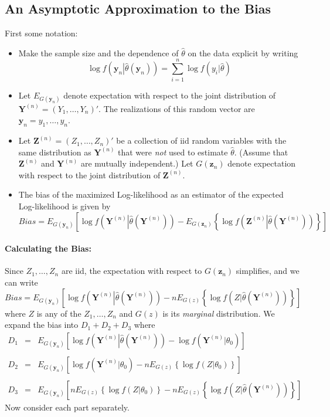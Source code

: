 \documentclass[12pt]{article}
\theoremstyle{definition}
\begin{document}
\subsection{An Asymptotic Approximation to the Bias}
First some notation:
	\begin{itemize}
		\item Make the sample size and the dependence of $\hat{\theta}$ on the data explicit by writing
	$$\log{f\left(\left.\mathbf{y}_n\right|\hat{\theta}(\mathbf{y}_n)\right)} = \sum_{i=1}^n \log{f(y_i|\hat{\theta})}$$
		\item Let $E_{G(\mathbf{y}_n)}$ denote expectation with respect to the joint distribution of $\mathbf{Y}^{(n)} = (Y_1, \hdots, Y_n)'$. The realizations of this random vector are $\mathbf{y}_n = y_1, \hdots, y_n$.
		\item Let $\mathbf{Z}^{(n)} = (Z_1, \hdots, Z_n)'$ be a collection of iid random variables with the same distribution as $\mathbf{Y}^{(n)}$ that were \emph{not} used to estimate $\hat{\theta}$. (Assume that $\mathbf{Z}^{(n)}$ and $\mathbf{Y}^{(n)}$ are mutually independent.) Let $G(\mathbf{z}_n)$ denote expectation with respect to the joint distribution of $\mathbf{Z}^{(n)}$.
		\item The bias of the maximized Log-likelihood as an estimator of the expected Log-likelihood is given by
	$$Bias = E_{G(\mathbf{y}_n)}\left[ \log{f\left(\left.\mathbf{Y}^{(n)}\right|\hat{\theta}\left(\mathbf{Y}^{(n)}\right)\right)} -  E_{G(\mathbf{z}_n)}\left\{  \log{f\left(\left.\mathbf{Z}^{(n)}\right|\hat{\theta}\left(\mathbf{Y}^{(n)}\right)\right)}\right\}\right]$$
\end{itemize}


\paragraph{Calculating the Bias:} Since $Z_1, \hdots, Z_n$ are iid, the expectation with respect to $G(\mathbf{z}_n)$ simplifies, and we can write
			$$Bias = E_{G(\mathbf{y}_n)}\left[ \log{f\left(\left.\mathbf{Y}^{(n)}\right|\hat{\theta}\left(\mathbf{Y}^{(n)}\right)\right)} -  nE_{G(z)}\left\{  \log{f\left(\left.Z\right|\hat{\theta}\left(\mathbf{Y}^{(n)}\right)\right)}\right\}\right]$$
where $Z$ is any of the $Z_1, \hdots, Z_n$ and $G(z)$ is its \emph{marginal} distribution. We expand the bias into $D_1 + D_2 + D_3$ where
	\begin{eqnarray*}
		D_1 &=& E_{G(\mathbf{y}_n)}\left[ \log{f\left(\left.\mathbf{Y}^{(n)}\right|\hat{\theta}\left(\mathbf{Y}^{(n)}\right)\right)} - \log{f\left( \mathbf{Y}^{(n)}|\theta_0 \right)}\right]\\\\
		D_2 &=& E_{G(\mathbf{y}_n)}\left[  \log{f\left( \mathbf{Y}^{(n)}|\theta_0 \right)} - nE_{G(z)}\left\{  \log{f\left(\left.Z\right|\theta_0\right)}\right\} \right]\\\\
		D_3 &=& E_{G(\mathbf{y}_n)}\left[ nE_{G(z)}\left\{  \log{f\left(\left.Z\right|\theta_0\right)}\right\}  -  nE_{G(z)}\left\{  \log{f\left(\left.Z\right|\hat{\theta}\left(\mathbf{Y}^{(n)}\right)\right)}\right\} \right]
	\end{eqnarray*}
Now consider each part separately.
\end{document}
